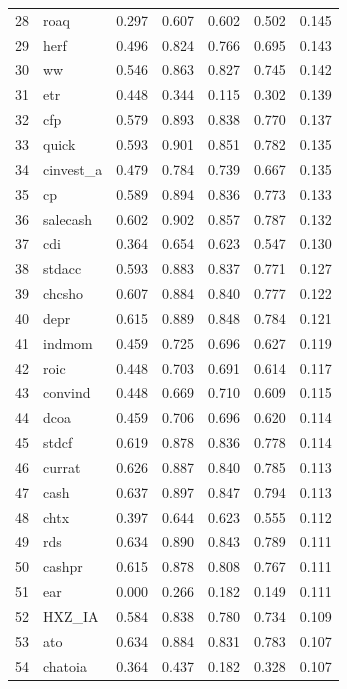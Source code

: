 \begin{footnotesize}
\begin{longtable}{rl|c|c|c|c|c}
		28 & roaq & 0.297 & 0.607 & 0.602 & 0.502 & 0.145 \\ 
		29 & herf & 0.496 & 0.824 & 0.766 & 0.695 & 0.143 \\ 
		30 & ww & 0.546 & 0.863 & 0.827 & 0.745 & 0.142 \\ 
		31 & etr & 0.448 & 0.344 & 0.115 & 0.302 & 0.139 \\ 
		32 & cfp & 0.579 & 0.893 & 0.838 & 0.770 & 0.137 \\ 
		33 & quick & 0.593 & 0.901 & 0.851 & 0.782 & 0.135 \\ 
		34 & cinvest\_a & 0.479 & 0.784 & 0.739 & 0.667 & 0.135 \\ 
		35 & cp & 0.589 & 0.894 & 0.836 & 0.773 & 0.133 \\ 
		36 & salecash & 0.602 & 0.902 & 0.857 & 0.787 & 0.132 \\ 
		37 & cdi & 0.364 & 0.654 & 0.623 & 0.547 & 0.130 \\ 
		38 & stdacc & 0.593 & 0.883 & 0.837 & 0.771 & 0.127 \\ 
		39 & chcsho & 0.607 & 0.884 & 0.840 & 0.777 & 0.122 \\ 
		40 & depr & 0.615 & 0.889 & 0.848 & 0.784 & 0.121 \\ 
		41 & indmom & 0.459 & 0.725 & 0.696 & 0.627 & 0.119 \\ 
		42 & roic & 0.448 & 0.703 & 0.691 & 0.614 & 0.117 \\ 
		43 & convind & 0.448 & 0.669 & 0.710 & 0.609 & 0.115 \\ 
		44 & dcoa & 0.459 & 0.706 & 0.696 & 0.620 & 0.114 \\ 
		45 & stdcf & 0.619 & 0.878 & 0.836 & 0.778 & 0.114 \\ 
		46 & currat & 0.626 & 0.887 & 0.840 & 0.785 & 0.113 \\ 
		47 & cash & 0.637 & 0.897 & 0.847 & 0.794 & 0.113 \\ 
		48 & chtx & 0.397 & 0.644 & 0.623 & 0.555 & 0.112 \\ 
		49 & rds & 0.634 & 0.890 & 0.843 & 0.789 & 0.111 \\ 
		50 & cashpr & 0.615 & 0.878 & 0.808 & 0.767 & 0.111 \\ 
		51 & ear & 0.000 & 0.266 & 0.182 & 0.149 & 0.111 \\ 
		52 & HXZ\_IA & 0.584 & 0.838 & 0.780 & 0.734 & 0.109 \\ 
		53 & ato & 0.634 & 0.884 & 0.831 & 0.783 & 0.107 \\ 
		54 & chatoia & 0.364 & 0.437 & 0.182 & 0.328 & 0.107 \\ 

\end{longtable}
\end{footnotesize}
